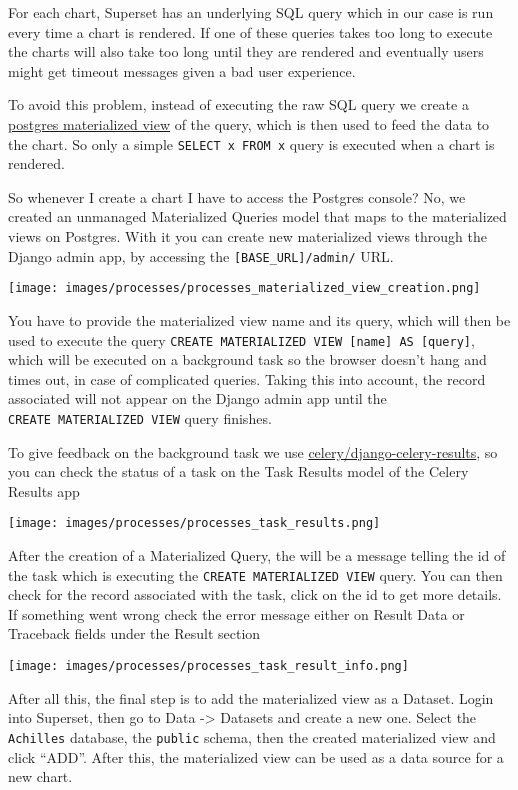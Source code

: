 \documentclass[
]{book}
\begin{document}
For each chart, Superset has an underlying SQL query which in our case is run every time a chart is rendered. If one of these queries takes too long to execute the charts will also take too long until they are rendered and eventually users might get timeout messages given a bad user experience.

To avoid this problem, instead of executing the raw SQL query we create a \href{https://www.postgresql.org/docs/10/rules-materializedviews.html}{postgres materialized view} of the query, which is then used to feed the data to the chart. So only a simple \texttt{SELECT\ x\ FROM\ x} query is executed when a chart is rendered.

So whenever I create a chart I have to access the Postgres console? No, we created an unmanaged Materialized Queries model that maps to the materialized views on Postgres. With it you can create new materialized views through the Django admin app, by accessing the \texttt{{[}BASE\_URL{]}/admin/} URL.

\texttt{[image: images/processes/processes\_materialized\_view\_creation.png]}

You have to provide the materialized view name and its query, which will then be used to execute the query \texttt{CREATE\ MATERIALIZED\ VIEW\ {[}name{]}\ AS\ {[}query{]}}, which will be executed on a background task so the browser doesn't hang and times out, in case of complicated queries. Taking this into account, the record associated will not appear on the Django admin app until the \texttt{CREATE\ MATERIALIZED\ VIEW} query finishes.

To give feedback on the background task we use \href{https://github.com/celery/django-celery-results}{celery/django-celery-results}, so you can check the status of a task on the Task Results model of the Celery Results app

\texttt{[image: images/processes/processes\_task\_results.png]}

After the creation of a Materialized Query, the will be a message telling the id of the task which is executing the \texttt{CREATE\ MATERIALIZED\ VIEW} query. You can then check for the record associated with the task, click on the id to get more details. If something went wrong check the error message either on Result Data or Traceback fields under the Result section

\texttt{[image: images/processes/processes\_task\_result\_info.png]}

After all this, the final step is to add the materialized view as a Dataset. Login into Superset, then go to Data -\textgreater{} Datasets and create a new one. Select the \texttt{Achilles} database, the \texttt{public} schema, then the created materialized view and click ``ADD''. After this, the materialized view can be used as a data source for a new chart.
\end{document}
